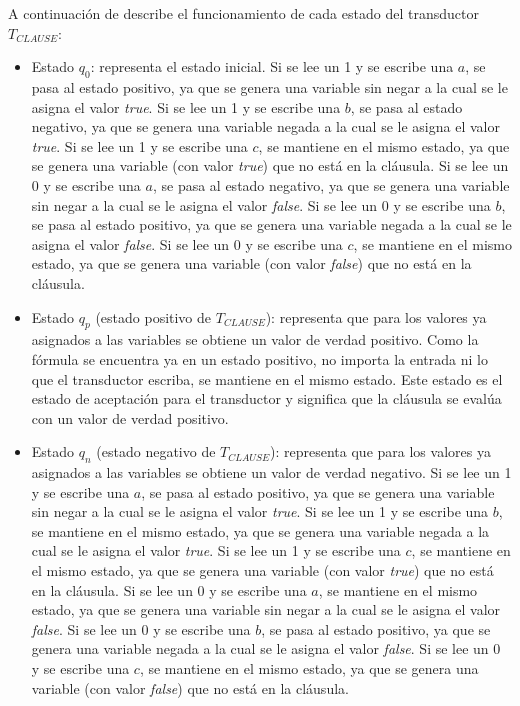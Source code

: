 \documentclass[12pt]{article}
\newcommand{\true}{\textit{true}}
\newcommand{\false}{\textit{false}}
\begin{document}
A continuación de describe el funcionamiento de cada estado del transductor $T_{CLAUSE}$:
\begin{itemize}
    \item Estado $q_0$: representa el estado inicial.  Si se lee un 1 y se escribe una $a$, se pasa al estado positivo, ya que se genera una variable sin negar a la cual se le asigna el valor \true{}.  Si se lee un 1 y se escribe una $b$, se pasa al estado negativo, ya que se genera una variable negada a la cual se le asigna el valor \true{}.  Si se lee un 1 y se escribe una $c$, se mantiene en el mismo estado, ya que se genera una variable (con valor \true) que no está en la cláusula.  Si se lee un 0 y se escribe una $a$, se pasa al estado negativo, ya que se genera una variable sin negar a la cual se le asigna el valor \false{}.  Si se lee un 0 y se escribe una $b$, se pasa al estado positivo, ya que se genera una variable negada a la cual se le asigna el valor \false{}.  Si se lee un 0 y se escribe una $c$, se mantiene en el mismo estado, ya que se genera una variable (con valor \false) que no está en la cláusula.
          
    \item Estado $q_p$ (estado positivo de $T_{CLAUSE}$): representa que para los valores ya asignados a las variables se obtiene un valor de verdad positivo.  Como la fórmula se encuentra ya en un estado positivo, no importa la entrada ni lo que el transductor escriba, se mantiene en el mismo estado.  Este estado es el estado de aceptación para el transductor y significa que la cláusula se evalúa con un valor de verdad positivo.
          
    \item Estado $q_n$ (estado negativo de $T_{CLAUSE}$): representa que para los valores ya asignados a las variables se obtiene un valor de verdad negativo.  Si se lee un 1 y se escribe una $a$, se pasa al estado positivo, ya que se genera una variable sin negar a la cual se le asigna el valor \true{}.  Si se lee un 1 y se escribe una $b$, se mantiene en el mismo estado, ya que se genera una variable negada a la cual se le asigna el valor \true{}.  Si se lee un 1 y se escribe una $c$, se mantiene en el mismo estado, ya que se genera una variable (con valor \true) que no está en la cláusula. Si se lee un 0 y se escribe una $a$, se mantiene en el mismo estado, ya que se genera una variable sin negar a la cual se le asigna el valor \false{}.  Si se lee un 0 y se escribe una $b$, se pasa al estado positivo, ya que se genera una variable negada a la cual se le asigna el valor \false{}.  Si se lee un 0 y se escribe una $c$, se mantiene en el mismo estado, ya que se genera una variable (con valor \false) que no está en la cláusula.
\end{itemize}
\end{document}
